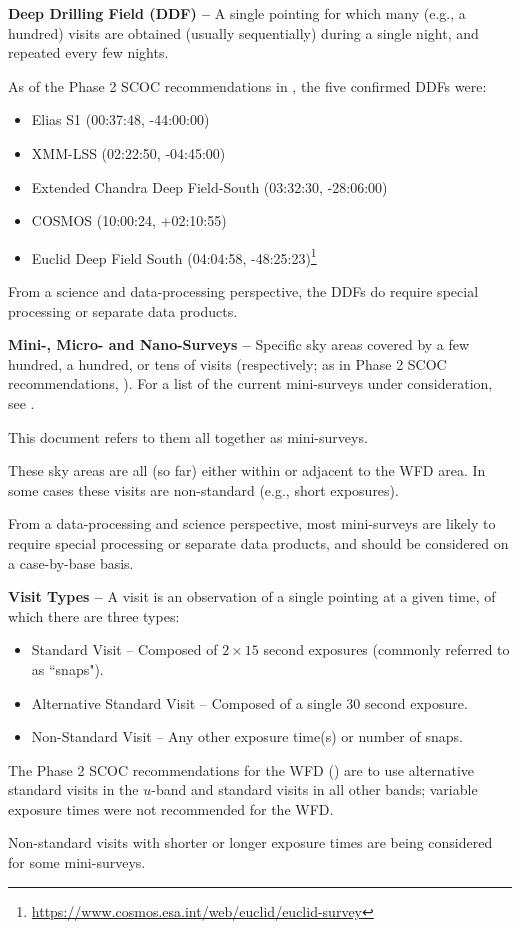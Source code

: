\textbf{Deep Drilling Field (DDF) -- }
A single pointing for which many (e.g., a hundred) visits are obtained 
(usually sequentially) during a single night, and repeated every few 
nights.

As of the Phase 2 SCOC recommendations in , the five 
confirmed DDFs were:

\begin{itemize}
\item Elias S1 (00:37:48, -44:00:00)
\item XMM-LSS (02:22:50, -04:45:00)
\item Extended Chandra Deep Field-South (03:32:30, -28:06:00)
\item COSMOS (10:00:24, +02:10:55)
\item Euclid Deep Field South  (04:04:58, -48:25:23)\footnote{\url{https://www.cosmos.esa.int/web/euclid/euclid-survey}}
\end{itemize}

From a science and data-processing perspective, the DDFs do require 
special processing or separate data products.


\textbf{Mini-, Micro- and Nano-Surveys -- }
Specific sky areas covered by a few hundred, a hundred, or tens of visits 
(respectively; as in Phase 2 SCOC recommendations, ).
For a list of the current mini-surveys under consideration, see 
.

This document refers to them all together as mini-surveys.

These sky areas are all (so far) either within or adjacent to the WFD area.
In some cases these visits are non-standard (e.g., short exposures).

From a data-processing and science perspective, most mini-surveys are 
likely to require special processing or separate data products, and should 
be considered on a case-by-base basis.


\textbf{Visit Types -- }
A visit is an observation of a single pointing at a given time, of which 
there are three types:

\begin{itemize}
\item Standard Visit -- Composed of $2\times15$ second exposures (commonly referred to as ``snaps").
\item Alternative Standard Visit -- Composed of a single $30$ second exposure.
\item Non-Standard Visit -- Any other exposure time(s) or number of snaps.
\end{itemize}

The Phase 2 SCOC recommendations for the WFD () are to 
use alternative standard visits in the $u$-band and standard visits in all 
other bands; variable exposure times were not recommended for the WFD. 

Non-standard visits with shorter or longer exposure times are being 
considered for some mini-surveys.